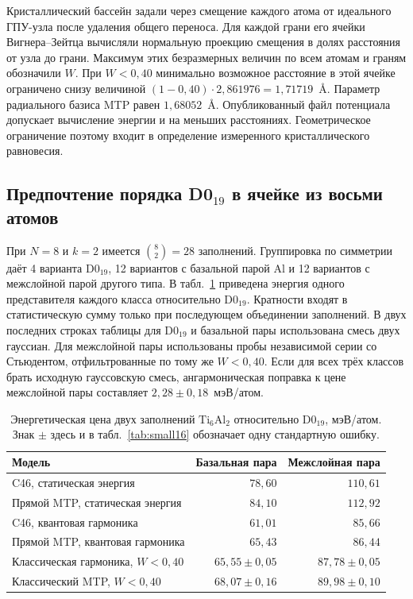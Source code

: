 Кристаллический бассейн задали через смещение каждого атома от идеального
ГПУ-узла после удаления общего переноса. Для каждой грани его ячейки
Вигнера--Зейтца вычисляли нормальную проекцию смещения в долях расстояния
от узла до грани. Максимум этих безразмерных величин по всем атомам и
граням обозначили $W$. При $W<0{,}40$ минимально возможное расстояние в
этой ячейке ограничено снизу величиной
$(1-0{,}40)\cdot 2{,}861976 = 1{,}71719$~\AA. Параметр радиального базиса
MTP равен $1{,}68052$~\AA. Опубликованный файл потенциала допускает
вычисление энергии и на меньших расстояниях. Геометрическое ограничение
поэтому входит в определение измеренного кристаллического равновесия.

\subsection{Предпочтение порядка \texorpdfstring{D0$_{19}$}{D0₁₉} в ячейке из восьми атомов}

При $N=8$ и $k=2$ имеется $\binom82=28$ заполнений. Группировка по симметрии
даёт 4 варианта D0$_{19}$, 12 вариантов с базальной парой Al и 12 вариантов
с межслойной парой другого типа. В табл.~\ref{tab:small8} приведена энергия
одного представителя каждого класса относительно D0$_{19}$. Кратности входят
в статистическую сумму только при последующем объединении заполнений.
В двух последних строках таблицы для D0$_{19}$ и базальной пары использована
смесь двух гауссиан. Для межслойной пары использованы пробы независимой серии
со Стьюдентом, отфильтрованные по тому же $W<0{,}40$. Если для всех трёх
классов брать исходную гауссовскую смесь, ангармоническая поправка к цене
межслойной пары составляет $2{,}28\pm0{,}18$~мэВ/атом.

\begin{table}[htbp]
\centering\small
\caption{Энергетическая цена двух заполнений $\mathrm{Ti}_6\mathrm{Al}_2$
относительно D0$_{19}$, мэВ/атом. Знак $\pm$ здесь и в
табл.~\ref{tab:small16} обозначает одну стандартную ошибку.}
\label{tab:small8}
\begin{tabular}{@{}lrr@{}}
\hline
Модель & Базальная пара & Межслойная пара\\
\hline
C46, статическая энергия & $78{,}60$ & $110{,}61$\\
Прямой MTP, статическая энергия & $84{,}10$ & $112{,}92$\\
C46, квантовая гармоника & $61{,}01$ & $85{,}66$\\
Прямой MTP, квантовая гармоника & $65{,}43$ & $86{,}44$\\
Классическая гармоника, $W<0{,}40$ & $65{,}55\pm0{,}05$ & $87{,}78\pm0{,}05$\\
Классический MTP, $W<0{,}40$ & $68{,}07\pm0{,}16$ & $89{,}98\pm0{,}10$\\
\hline
\end{tabular}
\end{table}

